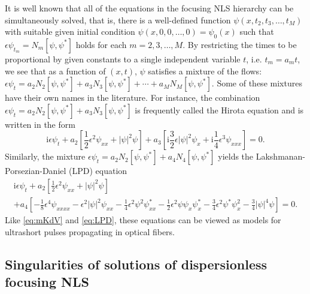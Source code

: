 \documentclass[12pt]{amsart}
\numberwithin{equation}{section}
\newcommand{\ii}{\mathrm{i}}
\newcommand{\eps}{\epsilon}
\begin{document}
It is well known that all of the equations in the focusing NLS hierarchy can be simultaneously solved, that is, there is a well-defined function $\psi(x,t_2,t_3,\dots,t_M)$ with suitable given initial condition $\psi(x,0,0,\dots,0)=\psi_0(x)$ such that $\epsilon\psi_{t_m}=N_m[\psi,\psi^*]$ holds for each $m=2,3,\dots,M$.  By restricting the times to be proportional by given constants to a single independent variable $t$, i.e. $t_m=a_mt$, we see that as a function of $(x,t)$, $\psi$ satisfies a mixture of the flows:  $\epsilon\psi_t = a_2N_2[\psi,\psi^*] + a_3N_3[\psi,\psi^*] + \cdots + a_MN_M[\psi,\psi^*]$. Some of these mixtures have their own names in the literature. For instance, the combination $\epsilon\psi_t=a_2N_2[\psi,\psi^*]+a_3N_3[\psi,\psi^*]$ is frequently called the Hirota equation and is written in the form
\begin{equation}
\ii\epsilon\psi_t +a_2\left[\frac{1}{2}\epsilon^2\psi_{xx}+|\psi|^2\psi\right] + a_3\left[\ii \frac{3}{2}\epsilon|\psi|^2\psi_x +\ii \frac{1}{4} \eps^3\psi_{xxx}\right]=0.
\label{eq:Hirota}
\end{equation}
Similarly, the mixture $\epsilon\psi_t = a_2N_2[\psi,\psi^*]+a_4 N_4[\psi,\psi^*]$ yields the  Lakshmanan-Porsezian-Daniel (LPD) equation
\begin{multline}
\ii\epsilon\psi_t 
+ a_2\left[ \frac{1}{2}\epsilon^2\psi_{xx}+|\psi|^2\psi \right]  \\
+ a_4\left[ -\frac{1}{8}\epsilon^4\psi_{xxxx}-\epsilon^2 |\psi|^2\psi_{xx}-\frac{1}{4}\epsilon^2\psi^2\psi^*_{xx}-\frac{1}{2}\epsilon^2\psi\psi_x\psi^*_x-\frac{3}{4}\epsilon^2\psi^*\psi_x^2 -\frac{3}{4}|\psi|^4\psi \right]=0.
\label{eq:gLPD}
\end{multline}
Like \eqref{eq:mKdV} and \eqref{eq:LPD}, these equations can be viewed as models for ultrashort pulses propagating in optical fibers.



\subsection{Singularities of solutions of dispersionless focusing NLS}
\label{sec-dispersionless}
\end{document}
